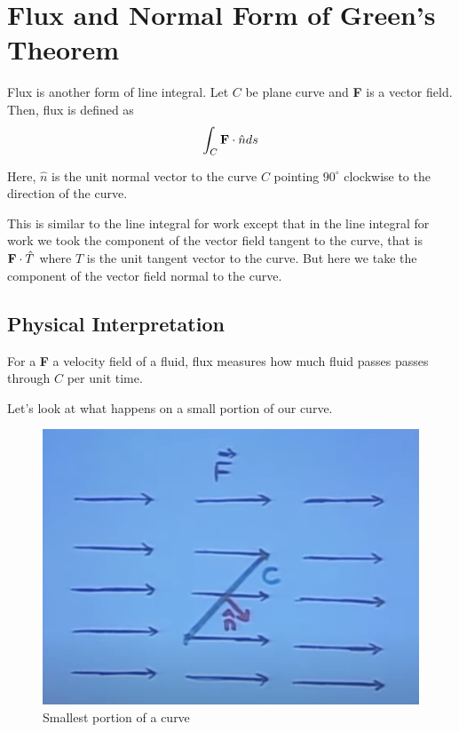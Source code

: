 

\chapter{Flux and Normal Form of Green's Theorem}

\bigbreak

Flux is another form of line integral.
Let $C$ be plane curve and {\bf F} is a vector field. 
Then, flux is defined as 
$$ \int_C {\bf F} \cdot \hat{n} ds $$

Here, $\hat{n}$ is the unit normal vector to the curve $C$ pointing $90^{\circ}$ clockwise to the direction of the curve.

This is similar to the line integral for work except that in the line integral for work we took the component of the vector field tangent to the curve, that is ${\bf F} \cdot \hat{T}$ where $\hat{T}$ is the unit tangent vector to the curve.
But here we take the component of the vector field normal to the curve.


\section{Physical Interpretation}

For a {\bf F} a velocity field of a fluid, flux measures how much fluid passes passes through $C$ per unit time.

Let's look at what happens on a small portion of our curve.

\begin{figure}[ht!]
    \centering
    \includegraphics[scale=0.3]{./images/lecture_19_figure_1.png}
    \caption{Smallest portion of a curve}
\end{figure}

